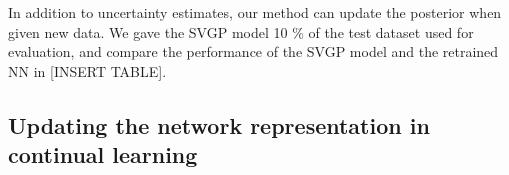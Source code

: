 \documentclass{article}
\makeatletter
\newcommand{\ie}{\textit{i.e.\@}\xspace}
\newcommand{\mbf}[1]{\mathbf{#1}}
\newcommand{\MB}{\mbf{B}}
\newcommand{\MI}{\mbf{I}}
\makeatother
\begin{document}
In addition to uncertainty estimates, our method can update the posterior when given new data. We gave the SVGP model 10 \% of the test dataset used for evaluation, and compare the performance of the SVGP model and the retrained NN in [INSERT TABLE]. 



\subsection{Updating the network representation in continual learning}
\label{sec:cl-exp}
%
%
%
%
%
\end{document}
